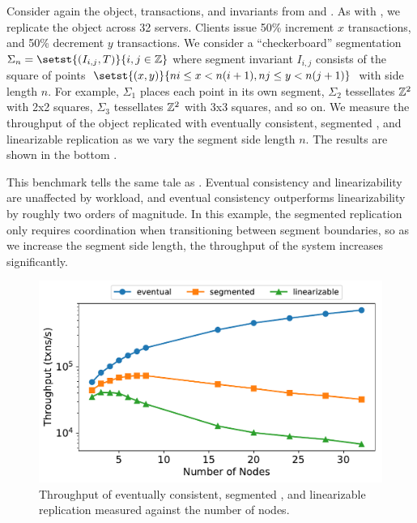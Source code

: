 \begin{benchmark}
  Consider again the object, transactions, and invariants from 
  and . As with , we replicate
  the object across 32 servers. Clients issue 50\% increment $x$ transactions,
  and 50\% decrement $y$ transactions. We consider a ``checkerboard''
  segmentation $\Sigma_n = \setst{(I_{i, j}, T)}{i, j \in \ints}$ where segment
  invariant $I_{i, j}$ consists of the square of points $\setst{(x, y)}{ni \leq
  x < n(i + 1), nj \leq y < n(j + 1)}$ with side length $n$. For example,
  $\Sigma_1$ places each point in its own segment, $\Sigma_2$ tessellates
  $\mathbb{Z}^2$ with 2x2 squares, $\Sigma_3$ tessellates $\mathbb{Z}^2$ with 3x3
  squares, and so on. We measure the throughput of the object replicated with
  eventually consistent, segmented \invariantconfluent{}, and linearizable
  replication as we vary the segment side length $n$. The results are shown in
  the bottom .

  This benchmark tells the same tale as . Eventual
  consistency and linearizability are unaffected by workload, and eventual
  consistency outperforms linearizability by roughly two orders of magnitude.
  In this example, the segmented \invariantconfluent{} replication only
  requires coordination when transitioning between segment boundaries, so as we
  increase the segment side length, the throughput of the system increases
  significantly.
\end{benchmark}

\begin{figure}[ht]
  \centering
  \includegraphics[width=\columnwidth]{figures/vary_nodes.pdf}
  \caption{%
    Throughput of eventually consistent, segmented \invariantconfluent{}, and
    linearizable replication measured against the number of
    nodes.
  }
\end{figure}

